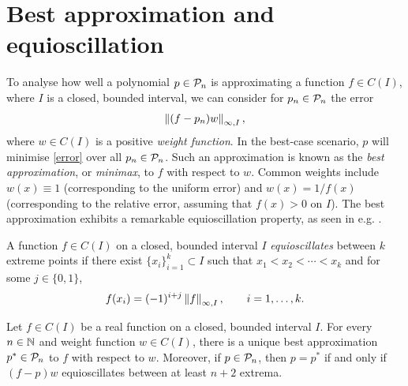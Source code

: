 

\section{Best approximation and equioscillation}

To analyse how well a polynomial $p \in \mathcal{P}_n$ is approximating a function $f \in C(I)$, where $I$ is a closed, bounded interval, we can consider for $p_n \in \mathcal{P}_n$ the error
\begin{align}
    \left\lVert(f-p_n)w\right\rVert_{\infty,I}, \label{error}
\end{align}
where $w \in C(I)$ is a positive \textit{weight function}. In the best-case scenario, $p$ will minimise \eqref{error} over all $p_n \in \mathcal{P}_n$. Such an approximation is known as the \textit{best approximation}, or \textit{minimax}, to $f$ with respect to $w$. Common weights include $w(x) \equiv 1$ (corresponding to the uniform error) and $w(x)=1/f(x)$ (corresponding to the relative error, assuming that $f(x)> 0$ on $I$). The best approximation exhibits a remarkable equioscillation property, as seen in e.g$.$ \cite[Chapter II]{AkhApprox}. 


\begin{defn}
A function $f \in C(I)$ on a closed, bounded interval $I$ \textit{equioscillates} between $k$ extreme points if there exist $\{x_i\}_{i=1}^k \subset I$ such that $x_1 < x_2 < \cdots < x_k$ and for some $j \in \{0,1\}$,
\[f(x_i) = (-1)^{i+j}\left\lVert f\right\rVert_{\infty,I}, \qquad i=1,\dots,k.\]
\end{defn}

\begin{thm}\label{equioscthm}
Let $f\in C(I)$ be a real function on a closed, bounded interval $I$. For every $n \in \mathbb{N}$ and weight function $w \in C(I)$, there is a unique best approximation $p^* \in \mathcal{P}_n$ to $f$ with respect to $w$. Moreover, if $p \in \mathcal{P}_n$, then $p = p^*$ if and only if $(f-p)w$ equioscillates between at least $n+2$ extrema.
\end{thm}

